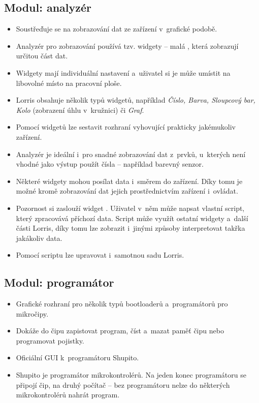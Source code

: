 \documentclass[12pt, a4paper, oneside]{article}
\newcommand{\It}{\textit}  %
\begin{document}
\subsection*{Modul: analyzér}
\begin{itemize} 
    \item Soustřeďuje se na zobrazování dat ze zařízení v~grafické podobě.
    \item Analyzér pro zobrazování používá tzv. widgety -- malá , která zobrazují určitou část dat.
    \item Widgety mají individuální nastavení a~uživatel si je může umístit na libovolné místo na pracovní ploše.
    \item Lorris obsahuje několik typů widgetů, například \It{Číslo, Barva, Sloupcový bar, Kolo} (zobrazení úhlu v~kružnici) či \It{Graf}.
    \item Pomocí widgetů lze sestavit rozhraní vyhovující prakticky jakémukoliv zařízení.
    \item Analyzér je ideální i~pro snadné zobrazování dat z~prvků, u~kterých není vhodné jako výstup použít čísla -- například barevný senzor.
    \item Některé widgety mohou posílat data i~směrem do zařízení. Díky tomu je možné kromě zobrazování dat jejich prostřednictvím zařízení i~ovládat.
    \item Pozornost si zaslouží widget . Uživatel v~něm může napsat vlastní script, který zpracovává příchozí data. Script může využít ostatní widgety a~další části Lorris, díky tomu lze zobrazit i~jinými způsoby interpretovat takřka jakákoliv data.
    \item Pomocí scriptu lze upravovat i~samotnou sadu Lorris.
\end{itemize}

\subsection*{Modul: programátor}
\begin{itemize}
    \item Grafické rozhraní pro několik typů bootloaderů a~programátorů pro mikročipy.
    \item Dokáže do čipu zapistovat program, číst a~mazat paměť čipu nebo programovat pojistky.
    \item Oficiální GUI k~programátoru Shupito.
    \item Shupito je programátor mikrokontrolérů. Na jeden konec programátoru se připojí čip, na druhý počítač -- bez programátoru nelze do některých mikrokontrolérů nahrát program.
\end{itemize}
\end{document}
